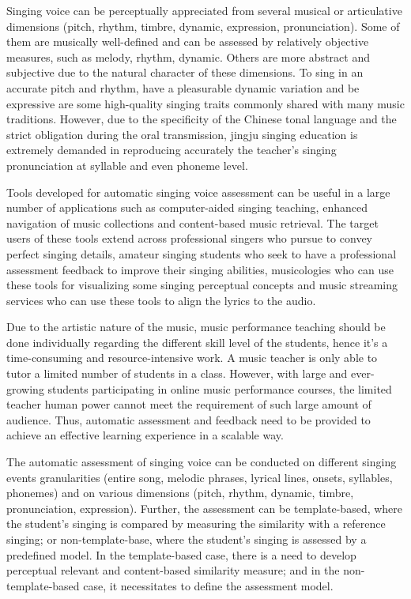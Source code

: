 Singing voice can be perceptually appreciated from several musical or articulative dimensions (pitch, rhythm, timbre, dynamic, expression, pronunciation). Some of them are musically well-defined and can be assessed by relatively objective measures, such as melody, rhythm, dynamic. Others are more abstract and subjective due to the natural character of these dimensions. To sing in an accurate pitch and rhythm, have a pleasurable dynamic variation and be expressive are some high-quality singing traits commonly shared with many music traditions. However, due to the specificity of the Chinese tonal language and the strict obligation during the oral transmission, jingju singing education is extremely demanded in reproducing accurately the teacher's singing pronunciation at syllable and even phoneme level.

Tools developed for automatic singing voice assessment can be useful in a large number of applications such as computer-aided singing teaching, enhanced navigation of music collections and content-based music retrieval. The target users of these tools extend across professional singers who pursue to convey perfect singing details, amateur singing students who seek to have a professional assessment feedback to improve their singing abilities, musicologies who can use these tools for visualizing some singing perceptual concepts and music streaming services who can use these tools to align the lyrics to the audio.

Due to the artistic nature of the music, music performance teaching should be done individually regarding the different skill level of the students, hence it's a time-consuming and resource-intensive work. A music teacher is only able to tutor a limited number of students in a class. However, with large and ever-growing students participating in online music performance courses, the limited teacher human power cannot meet the requirement of such large amount of audience. Thus, automatic assessment and feedback need to be provided to achieve an effective learning experience in a scalable way. 

The automatic assessment of singing voice can be conducted on different singing events granularities (entire song, melodic phrases, lyrical lines, onsets, syllables, phonemes) and on various dimensions (pitch, rhythm, dynamic, timbre, pronunciation, expression). Further, the assessment can be template-based, where the student's singing is compared by measuring the similarity with a reference singing; or non-template-base, where the student's singing is assessed by a predefined model. In the template-based case, there is a need to develop perceptual relevant and content-based similarity measure; and in the non-template-based case, it necessitates to define the assessment model.

